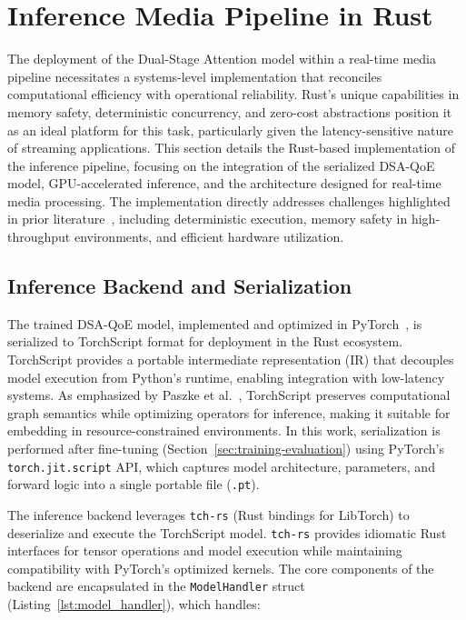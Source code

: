 \section{Inference Media Pipeline in Rust}
\label{sec:rust_pipeline}

The deployment of the Dual-Stage Attention model within a real-time media pipeline necessitates a systems-level implementation that reconciles computational efficiency with operational reliability. Rust's unique capabilities in memory safety, deterministic concurrency, and zero-cost abstractions position it as an ideal platform for this task, particularly given the latency-sensitive nature of streaming applications. This section details the Rust-based implementation of the inference pipeline, focusing on the integration of the serialized DSA-QoE model, GPU-accelerated inference, and the architecture designed for real-time media processing. The implementation directly addresses challenges highlighted in prior literature~\cite{fulton2022benefits, johansson2023transitioning, sharma2023rust}, including deterministic execution, memory safety in high-throughput environments, and efficient hardware utilization.

\subsection{Inference Backend and Serialization}
\label{sec:rust_serialization}

The trained DSA-QoE model, implemented and optimized in PyTorch~\cite{paszke2019pytorch}, is serialized to TorchScript format for deployment in the Rust ecosystem. TorchScript provides a portable intermediate representation (IR) that decouples model execution from Python's runtime, enabling integration with low-latency systems. As emphasized by Paszke et al.~\cite{paszke2019pytorch}, TorchScript preserves computational graph semantics while optimizing operators for inference, making it suitable for embedding in resource-constrained environments. In this work, serialization is performed after fine-tuning (Section~\ref{sec:training-evaluation}) using PyTorch's \texttt{torch.jit.script} API, which captures model architecture, parameters, and forward logic into a single portable file (\texttt{.pt}).

The inference backend leverages \texttt{tch-rs} (Rust bindings for LibTorch) to deserialize and execute the TorchScript model. \texttt{tch-rs} provides idiomatic Rust interfaces for tensor operations and model execution while maintaining compatibility with PyTorch's optimized kernels. The core components of the backend are encapsulated in the \texttt{ModelHandler} struct (Listing~\ref{lst:model_handler}), which handles:

